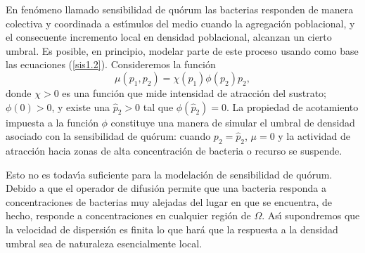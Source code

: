 \documentclass[portrait, a0b,final]{a0poster}%
\numberwithin{equation}{section}
\newenvironment{poster}{
  \begin{center}
  \begin{minipage}[c]{0.98\textwidth}
}{
  \end{minipage}
  \end{center}
}
\newenvironment{pcolumn}[1]{
  \begin{minipage}{#1\textwidth}
  \begin{center}
}{
  \end{center}
  \end{minipage}
}
\newcommand{\pbox}[4]{
\psshadowbox[#3]{
\begin{minipage}[t][#2][t]{#1}
#4
\end{minipage}
}}
\begin{document}
\begin{poster}
\begin{center}
\begin{pcolumn}{0.32}
{\begin{center}
        \pbox{0.8\textwidth}{}%
        {linewidth=2mm,framearc=0.1,linecolor=lightblue,fillstyle=gradient,gradangle=0,%
        gradbegin=white,gradend=whiteblue,gradmidpoint=1.0,framesep=1em}{%
        \begin{center}
           Teor\'ia de Juegos 
        \end{center}}
    \end{center}
    \vspace{1.25cm}
\setcounter{section}{4}%
\setcounter{equation}{0}%
 En fen\'{o}meno llamado sensibilidad de
qu\'{o}rum las bacterias responden de manera colectiva y coordinada a
est\'{\i}mulos del medio cuando la agregaci\'{o}n poblacional, y el
consecuente incremento local en densidad poblacional, alcanzan un
cierto umbral. Es posible, en principio, modelar parte de este
proceso usando como base las ecuaciones (\ref{sis1.2}).
Consideremos la funci\'{o}n
\[
\mu \left( p_{1},p_{2}\right) =\chi (p_{1})\phi (p_{2})p_{2},
\]
donde $\chi >0$ es una funci\'{o}n que mide intensidad de atracci\'{o}n
del sustrato;  $\phi (0)>0$, y existe una $\hat{p}_{2}>0$ tal que
$\phi (\hat{p}_{2})=0$. La propiedad de acotamiento impuesta a la
funci\'{o}n $\phi $ constituye una manera de simular el umbral de
densidad asociado con la sensibilidad de qu\'{o}rum: cuando
$p_{2}=\hat{p}_{2}$, $\mu =0$ y la actividad de atracci\'{o}n hacia
zonas de alta concentraci\'{o}n de bacteria o recurso se suspende.

Esto no es todav\'{\i}a suficiente para la modelaci\'{o}n de sensibilidad
de qu\'{o}rum. Debido a que el operador de difusi\'{o}n permite que una
bacteria responda a concentraciones de bacterias muy alejadas del
lugar en que se encuentra, de hecho, responde a concentraciones en
cualquier regi\'{o}n de $\Omega $. As\'{\i} supondremos que la velocidad de
dispersi\'{o}n es finita lo que har\'{a} que la respuesta a la densidad
umbral sea de naturaleza esencialmente local.

}
\end{pcolumn}
\end{center}
\end{poster}
\end{document}
